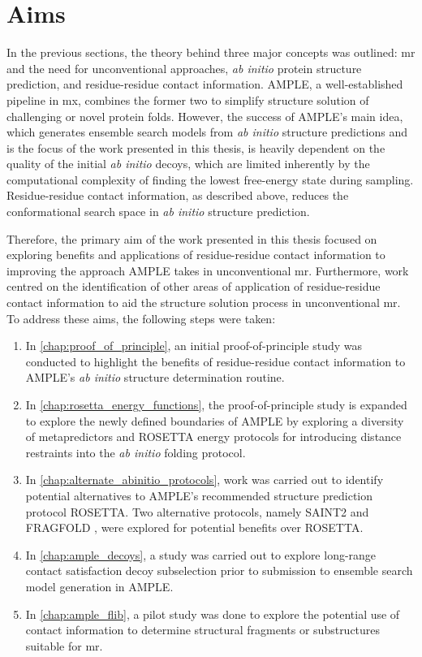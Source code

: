\section{Aims}
In the previous sections, the theory behind three major concepts was outlined: \acrlong{mr} and the need for unconventional approaches, \textit{ab initio} protein structure prediction, and residue-residue contact information. AMPLE, a well-established pipeline in \gls{mx}, combines the former two to simplify structure solution of challenging or novel protein folds. However, the success of AMPLE's main idea, which generates ensemble search models from \textit{ab initio} structure predictions and is the focus of the work presented in this thesis, is heavily dependent on the quality of the initial \textit{ab initio} decoys, which are limited inherently by the computational complexity of finding the lowest free-energy state during sampling. Residue-residue contact information, as described above, reduces the conformational search space in \textit{ab initio} structure prediction.

Therefore, the primary aim of the work presented in this thesis focused on exploring benefits and applications of residue-residue contact information to improving the approach AMPLE takes in unconventional \gls{mr}. Furthermore, work centred on the identification of other areas of application of residue-residue contact information to aid the structure solution process in unconventional \gls{mr}. To address these aims, the following steps were taken:

\begin{enumerate}
    \item In \cref{chap:proof_of_principle}, an initial proof-of-principle study was conducted to highlight the benefits of residue-residue contact information to AMPLE's \textit{ab initio} structure determination routine.
    \item In \cref{chap:rosetta_energy_functions}, the proof-of-principle study is expanded to explore the newly defined boundaries of AMPLE by exploring a diversity of metapredictors and ROSETTA energy protocols for introducing distance restraints into the \textit{ab initio} folding protocol.
    \item In \cref{chap:alternate_abinitio_protocols}, work was carried out to identify potential alternatives to AMPLE's recommended structure prediction protocol ROSETTA. Two alternative protocols, namely SAINT2 \cite{De_Oliveira2017-sg} and FRAGFOLD \cite{Kosciolek2014-bt}, were explored for potential benefits over ROSETTA.
    \item In \cref{chap:ample_decoys}, a study was carried out to explore long-range contact satisfaction decoy subselection prior to submission to ensemble search model generation in AMPLE. 
    \item In \cref{chap:ample_flib}, a pilot study was done to explore the potential use of contact information to determine structural fragments or substructures suitable for \gls{mr}.
\end{enumerate}
